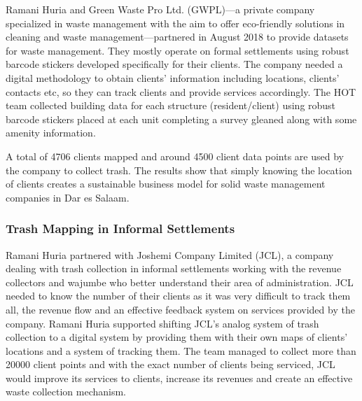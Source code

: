 \documentclass[a4paper,12pt,twoside]{article}
\begin{document}
\begin{multicols}{2}
	Ramani Huria and Green Waste Pro Ltd. (GWPL)---a private company specialized in waste management with the aim to offer eco-friendly solutions in cleaning and waste management---partnered in August 2018 to provide datasets for waste management. They mostly operate on formal settlements using robust barcode stickers developed specifically for their clients. The company needed a digital methodology to obtain clients’ information including locations, clients' contacts etc, so they can track clients and provide services accordingly. The HOT team collected building data for each structure (resident/client) using robust barcode stickers placed at each unit completing a survey gleaned along with some amenity information. 
	
	A total of 4706 clients mapped and around 4500 client data points are used by the company to collect trash. The results show that simply knowing the location of clients creates a sustainable business model  for solid waste management companies in Dar es Salaam. 
\end{multicols}

\subsubsection{Trash Mapping in Informal Settlements}
\begin{multicols}{2}
Ramani Huria partnered with Joshemi Company Limited (JCL), a company dealing with trash collection in informal settlements working with the revenue collectors and wajumbe who better understand their area of administration. JCL needed to know the number of their clients as it was very difficult to track them all, the revenue flow and an effective feedback system on services provided by the company.
Ramani Huria supported shifting JCL’s analog system of trash collection to a digital system by providing them with their own maps of clients’ locations and a system of tracking them. The team managed to collect more than 20000 client points and with the exact number of clients being serviced, JCL would improve its services to clients, increase its revenues and create an effective waste collection mechanism.
\end{multicols}

\newpage
\end{document}
